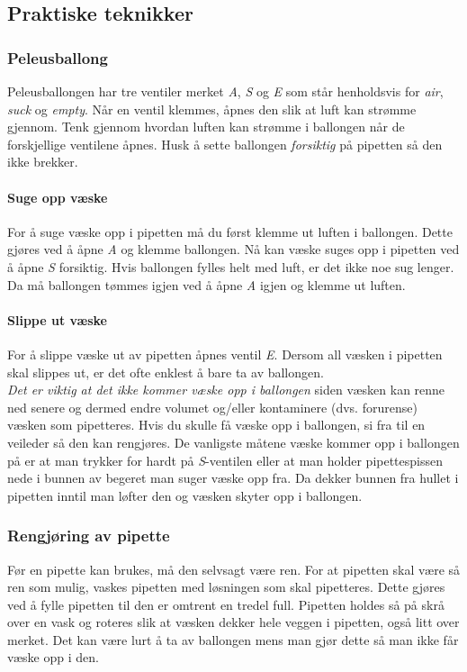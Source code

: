 \documentclass[hidelinks,12pt,norsk,a4paper,fleqn]{scrartcl}
\begin{document}
	\subsection{Praktiske teknikker}
	
	\subsubsection{Peleusballong}
	Peleusballongen har tre ventiler merket \emph{A}, \emph{S} og \emph{E} som står henholdsvis for \emph{air}, \emph{suck} og \emph{empty}. Når en ventil klemmes, åpnes den slik at luft kan strømme gjennom. Tenk gjennom hvordan luften kan strømme i ballongen når de forskjellige ventilene åpnes. Husk å sette ballongen \emph{forsiktig} på pipetten så den ikke brekker.
	
	\paragraph{Suge opp væske}
	For å suge væske opp i pipetten må du først klemme ut luften i ballongen. Dette gjøres ved å åpne \emph{A} og klemme ballongen. Nå kan væske suges opp i pipetten ved å åpne \emph{S} forsiktig. Hvis ballongen fylles helt med luft, er det ikke noe sug lenger. Da må ballongen tømmes igjen ved å åpne \emph{A} igjen og klemme ut luften.
	
	\paragraph{Slippe ut væske}
	For å slippe væske ut av pipetten åpnes ventil \emph{E}. Dersom all væsken i pipetten skal slippes ut, er det ofte enklest å bare ta av ballongen.\\[\parskip]
	
	\noindent\emph{Det er viktig at det ikke kommer væske opp i ballongen} siden væsken kan renne ned senere og dermed endre volumet og/eller kontaminere (dvs. forurense) væsken som pipetteres. Hvis du skulle få væske opp i ballongen, si fra til en veileder så den kan rengjøres. De vanligste måtene væske kommer opp i ballongen på er at man trykker for hardt på \emph{S}-ventilen eller at man holder pipettespissen nede i bunnen av begeret man suger væske opp fra. Da dekker bunnen fra hullet i pipetten inntil man løfter den og væsken skyter opp i ballongen.
	
	\subsubsection{Rengjøring av pipette}
	Før en pipette kan brukes, må den selvsagt være ren. For at pipetten skal være så ren som mulig, vaskes pipetten med løsningen som skal pipetteres. Dette gjøres ved å fylle pipetten til den er omtrent en tredel full. Pipetten holdes så på skrå over en vask og roteres slik at væsken dekker hele veggen i pipetten, også litt over merket. Det kan være lurt å ta av ballongen mens man gjør dette så man ikke får væske opp i den.
	
\end{document}
